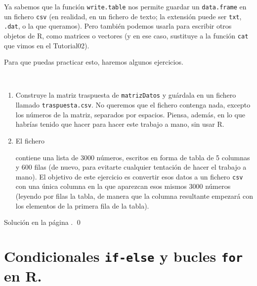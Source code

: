 \documentclass[10pt,a4paper]{article}\usepackage[]{graphicx}\usepackage[]{color}
\newcounter {cont01}
\begin{document}
Ya sabemos que la función {\tt write.table} nos permite guardar un {\tt data.frame} en un fichero {\tt csv} (en realidad, en un fichero de texto; la extensión puede ser {\tt txt}, {\tt .dat}, o la que queramos). Pero también podemos usarla para escribir otros objetos de R, como matrices o vectores (y en ese caso,
sustituye a la función {\tt cat} que vimos en el Tutorial02).

Para que puedas practicar esto, haremos algunos ejercicios.
\begin{ejercicio}
\label{tut04:ejercicio07}
\quad\\
\begin{enumerate}
  \item Construye la matriz traspuesta de {\tt matrizDatos}  y guárdala en un fichero llamado {\tt traspuesta.csv}. No queremos que el fichero contenga nada, excepto los números de la matriz, separados por espacios. Piensa, además, en lo que habrías tenido que hacer para hacer este trabajo a mano, sin usar R.
  \item El fichero
  \begin{center}
  \end{center}
  contiene una lista de 3000 números, escritos en forma de tabla de 5 columnas y 600 filas (de nuevo, para evitarte cualquier tentación de hacer el trabajo a mano). El objetivo de este ejercicio es convertir esos datos a un fichero {\tt csv} con una única columna en la que aparezcan esos mismos 3000 números (leyendo por filas la tabla, de manera que la columna resultante empezará con los elementos de la primera fila de la tabla).
\end{enumerate}
Solución en la página \pageref{tut04:ejercicio07:sol}.
\qed
\end{ejercicio}






%



\section{Condicionales {\tt if-else} y bucles {\tt for} en R.}
\label{tut04:sec:CondicionalesBucleForR}

\\
\end{document}
